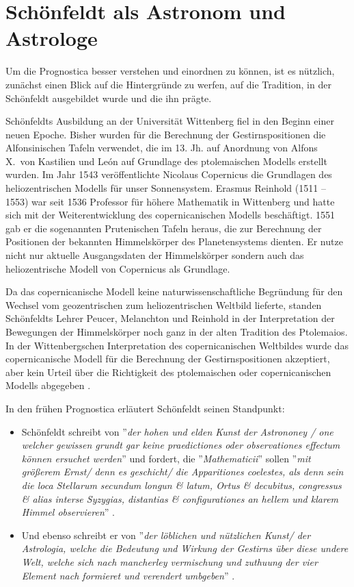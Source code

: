 \documentclass[12pt]{article}
\begin{document}
\section{Schönfeldt als Astronom und Astrologe}

Um die Prognostica besser verstehen und einordnen zu können, ist es nützlich, zunächst einen Blick auf die Hintergründe zu werfen, auf die Tradition, in der Schönfeldt ausgebildet wurde und die ihn prägte. 

Schönfeldts Ausbildung an der Universität Wittenberg fiel in den Beginn einer neuen Epoche. Bisher wurden für die Berechnung der Gestirnspositionen die Alfonsinischen Tafeln verwendet, die im 13. Jh. auf Anordnung von Alfons X.\ von Kastilien und Le\'{o}n auf Grundlage des ptolemaischen Modells erstellt wurden.  Im Jahr 1543 veröffentlichte Nicolaus Copernicus die Grundlagen des heliozentrischen Modells für unser Sonnensystem. Erasmus Reinhold (1511 -- 1553) war seit 1536 Professor für höhere Mathematik in Wittenberg und hatte sich mit der Weiterentwicklung des copernicanischen Modells beschäftigt. 1551 gab er die sogenannten Prutenischen Tafeln heraus, die zur Berechnung der Positionen der bekannten Himmelskörper des Planetensystems dienten. Er nutze nicht nur aktuelle Ausgangsdaten der Himmelskörper sondern auch das heliozentrische Modell von Copernicus als Grundlage.

Da das copernicanische Modell keine naturwissenschaftliche Begründung für den Wechsel vom geozentrischen zum heliozentrischen Weltbild lieferte, standen Schönfeldts Lehrer Peucer, Melanchton und Reinhold in der Interpretation der Bewegungen der Himmelskörper noch ganz in der alten Tradition des Ptolemaios. In der Wittenbergschen Interpretation des copernicanischen Weltbildes wurde das copernicanische Modell für die Berechnung der Gestirnspositionen akzeptiert, aber kein Urteil über die Richtigkeit des ptolemaischen oder copernicanischen Modells abgegeben \cite{Kremer2006}.

In den frühen Prognostica erläutert Schönfeldt seinen Standpunkt: 
\begin{itemize}
	\item Schönfeldt schreibt von ''\emph{der hohen und elden Kunst der Astrononey / one welcher gewissen grundt gar keine praedictiones oder observationes effectum können ersuchet werden}'' und fordert, 
	die ''\emph{Mathematicii}'' sollen ''\emph{mit größerem Ernst/ denn es geschicht/ die Apparitiones coelestes, als denn sein die loca Stellarum secundum longun \& latum, Ortus \& decubitus, congressus \& alias interse Syzygias, distantias \& configurationes an hellem und klarem Himmel observieren}'' \cite{Schoenfeldt1561}.
	\item Und ebenso schreibt er von ''\emph{der löblichen und nützlichen Kunst/ der Astrologia, welche die Bedeutung und Wirkung der Gestirns über diese undere Welt, welche sich nach mancherley vermischung und zuthuung der vier Element nach formieret und verendert umbgeben}'' \cite{Schoenfeldt1561}.
\end{itemize}
\end{document}
